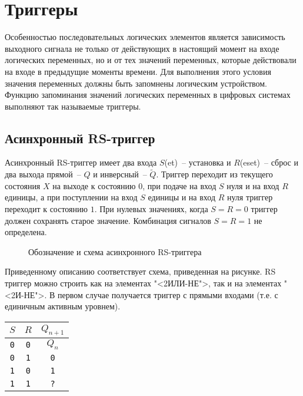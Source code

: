 \section{Триггеры}

Особенностью последовательных логических элементов является зависимость выходного сигнала не только от действующих в настоящий момент на входе логических переменных, но и от тех значений переменных, которые действовали на входе в предыдущие моменты времени. Для выполнения этого условия значения переменных должны быть запомнены логическим устройством. Функцию запоминания значений логических переменных в цифровых системах выполняют так называемые триггеры.

\subsection{Асинхронный RS-триггер}

Асинхронный RS-триггер имеет два входа $S$(et)~-- установка и $R$(eset)~-- сброс и два выхода прямой~-- $Q$ и инверсный~-- $\tilde Q$. Триггер переходит из текущего состояния $X$ на выходе к состоянию $0$, при подаче на вход $S$ нуля и на вход $R$ единицы, а при поступлении на вход $S$ единицы и на вход $R$ нуля триггер переходит к состоянию $1$. При нулевых значениях, когда $S=R=0$ триггер должен сохранять старое значение. Комбинация сигналов $S=R=1$ не определена.

\begin{figure}[ht]
\centering
{}
\caption{Обозначение и схема асинхронного RS-триггера}
\label{RS_trigger_arch}
\end{figure}

Приведенному описанию соответствует схема, приведенная на рисунке. RS триггер можно строить как на элементах "<2ИЛИ-НЕ">, так и на элементах "<2И-НЕ">. В первом случае получается триггер с прямыми входами (т.е. с единичным активным уровнем).

\begin{table}[h]
\centering
\begin{tabular}{|c|c|c|}
\hline
$S$        & $R$        & $Q_{n+1}$   \\ \hline
\texttt{0} & \texttt{0} & $Q_n$       \\
\texttt{0} & \texttt{1} & \texttt{0}  \\
\texttt{1} & \texttt{0} & \texttt{1}  \\
\texttt{1} & \texttt{1} & \texttt{?}  \\
\hline
\end{tabular}
\end{table}

